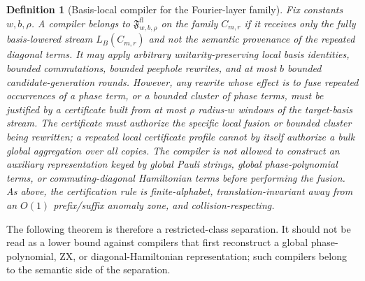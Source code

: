 \documentclass[11pt]{article}
\newtheorem{definition}{Definition}
\begin{document}
\begin{definition}[Basis-local compiler for the Fourier-layer family]
Fix constants $w,b,\rho$. A compiler belongs to
$\mathfrak{F}^{\mathrm{fl}}_{w,b,\rho}$ on the family $C_{m,r}$ if it receives
only the fully basis-lowered stream $L_B(C_{m,r})$ and not the semantic
provenance of the repeated diagonal terms. It may apply arbitrary
unitarity-preserving local basis identities, bounded commutations, bounded
peephole rewrites, and at most $b$ bounded candidate-generation rounds. However,
any rewrite whose effect is to fuse repeated occurrences of a phase term, or a
bounded cluster of phase terms, must be justified by a certificate built from
at most $\rho$ radius-$w$ windows of the target-basis stream. The certificate
must authorize the specific local fusion or bounded cluster being rewritten; a
repeated local certificate profile cannot by itself authorize a bulk global
aggregation over all copies. The compiler is not allowed to construct an
auxiliary representation keyed by global Pauli strings, global phase-polynomial
terms, or commuting-diagonal Hamiltonian terms before performing the fusion.
As above, the certification rule is finite-alphabet, translation-invariant
away from an $O(1)$ prefix/suffix anomaly zone, and collision-respecting.
\end{definition}

The following theorem is therefore a restricted-class separation. It should
not be read as a lower bound against compilers that first reconstruct a global
phase-polynomial, ZX, or diagonal-Hamiltonian representation; such compilers
belong to the semantic side of the separation.
\end{document}
